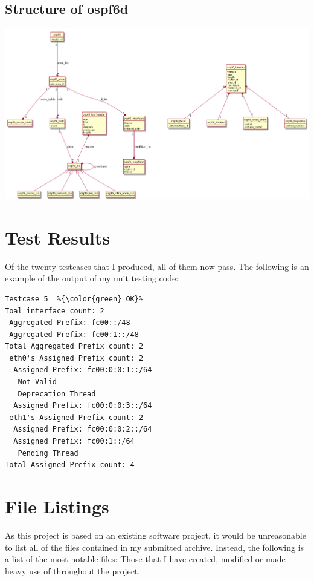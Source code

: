 \begin{landscape}
\chapter{Structure of ospf6d}
\label{ospf6d}
\begin{center}
  \includegraphics[width=0.9\linewidth]{../Diagrams/UML/quaggaOSPF6D/ospf6d_simple.png}
\end{center}

\end{landscape}

\chapter{Test Results}
\label{testResults}
Of the twenty testcases that I produced, all of them now pass. The following is an
example of the output of my unit testing code: 

\begin{lstlisting}
Testcase 5  %{\color{green} OK}%
Toal interface count: 2 
 Aggregated Prefix: fc00::/48
 Aggregated Prefix: fc00:1::/48
Total Aggregated Prefix count: 2 
 eth0's Assigned Prefix count: 2
  Assigned Prefix: fc00:0:0:1::/64
   Not Valid
   Deprecation Thread
  Assigned Prefix: fc00:0:0:3::/64
 eth1's Assigned Prefix count: 2
  Assigned Prefix: fc00:0:0:2::/64
  Assigned Prefix: fc00:1::/64
   Pending Thread
Total Assigned Prefix count: 4 
\end{lstlisting}

\chapter{File Listings}
As this project is based on an existing software project, it would be
unreasonable to list all of the files contained in my submitted archive.
Instead, the following is a list of the most notable files: Those that I have
created, modified or made heavy use of throughout the project.

